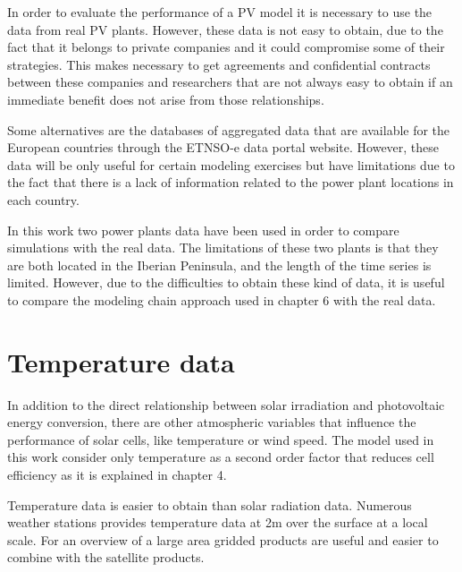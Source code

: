 In order to evaluate the performance of a PV model it is necessary to use the data from real PV plants. However, these data is not easy to obtain, due to the fact that it belongs to private companies and it could compromise some of their strategies. This makes necessary to get agreements and confidential contracts between these companies and researchers that are not always easy to obtain if an immediate benefit does not arise from those relationships.

Some alternatives are the databases of aggregated data that are available for the European countries through the ETNSO-e data portal website. However, these data will be only useful for certain modeling exercises but have limitations due to the fact that there is a lack of information related to the power plant locations in each country.

In this work two power plants data have been used in order to compare simulations with the real data. The limitations of these two plants is that they are both located in the Iberian Peninsula, and the length of the time series is limited. However, due to the difficulties to obtain these kind of data, it is useful to compare the modeling chain approach used in chapter 6 with the real data.


\section{Temperature data}

  In addition to the direct relationship between solar irradiation and photovoltaic energy conversion, there are other atmospheric variables that influence the performance of solar cells, like temperature or wind speed. The model used in this work consider only temperature as a second order factor that reduces cell efficiency as it is explained in chapter 4.
 
  Temperature data is easier to obtain than solar radiation data. Numerous weather stations provides temperature data at 2m over the surface at a local scale. For an overview of a large area gridded products are useful and easier to combine with the satellite products.

